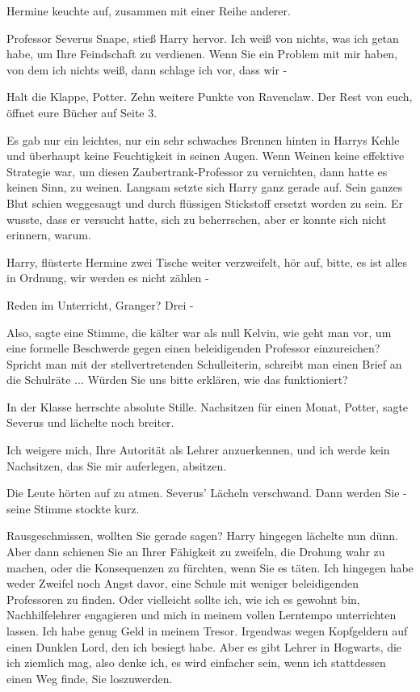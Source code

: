 Hermine keuchte auf, zusammen mit einer Reihe anderer.

\glqq{}Professor Severus Snape\grqq{}, stieß Harry hervor. \glqq{}Ich weiß von
nichts, was ich getan habe, um Ihre Feindschaft zu verdienen. Wenn Sie ein
Problem mit mir haben, von dem ich nichts weiß, dann schlage ich vor, dass wir
-\grqq{}

\glqq{}Halt die Klappe, Potter. Zehn weitere Punkte von Ravenclaw. Der Rest von
euch, öffnet eure Bücher auf Seite 3.\grqq{}

Es gab nur ein leichtes, nur ein sehr schwaches Brennen hinten in Harrys Kehle
und überhaupt keine Feuchtigkeit in seinen Augen. Wenn Weinen keine effektive
Strategie war, um diesen Zaubertrank-Professor zu vernichten, dann hatte es
keinen Sinn, zu weinen. Langsam setzte sich Harry ganz gerade auf. Sein ganzes
Blut schien weggesaugt und durch flüssigen Stickstoff ersetzt worden zu sein. Er
wusste, dass er versucht hatte, sich zu beherrschen, aber er konnte sich nicht
erinnern, warum.

\glqq{}Harry\grqq{}, flüsterte Hermine zwei Tische weiter verzweifelt, \glqq{}hör
auf, bitte, es ist alles in Ordnung, wir werden es nicht zählen -\grqq{}

\glqq{}Reden im Unterricht, Granger? Drei -\grqq{}

\glqq{}Also\grqq{}, sagte eine Stimme, die kälter war als null Kelvin, \glqq{}wie
geht man vor, um eine formelle Beschwerde gegen einen beleidigenden Professor
einzureichen? Spricht man mit der stellvertretenden Schulleiterin, schreibt man
einen Brief an die Schulräte ... Würden Sie uns bitte erklären, wie das
funktioniert?\grqq{}

In der Klasse herrschte absolute Stille. \glqq{}Nachsitzen für einen Monat,
Potter\grqq{}, sagte Severus und lächelte noch breiter.

\glqq{}Ich weigere mich, Ihre Autorität als Lehrer anzuerkennen, und ich werde
kein Nachsitzen, das Sie mir auferlegen, absitzen.\grqq{}

Die Leute hörten auf zu atmen. Severus' Lächeln verschwand. \glqq{}Dann werden
Sie -\grqq{} seine Stimme stockte kurz.

\glqq{}Rausgeschmissen, wollten Sie gerade sagen?\grqq{} Harry hingegen lächelte
nun dünn. \glqq{}Aber dann schienen Sie an Ihrer Fähigkeit zu zweifeln, die
Drohung wahr zu machen, oder die Konsequenzen zu fürchten, wenn Sie es täten.
Ich hingegen habe weder Zweifel noch Angst davor, eine Schule mit weniger
beleidigenden Professoren zu finden. Oder vielleicht sollte ich, wie ich es
gewohnt bin, Nachhilfelehrer engagieren und mich in meinem vollen Lerntempo
unterrichten lassen. Ich habe genug Geld in meinem Tresor. Irgendwas wegen
Kopfgeldern auf einen Dunklen Lord, den ich besiegt habe. Aber es gibt Lehrer in
Hogwarts, die ich ziemlich mag, also denke ich, es wird einfacher sein, wenn ich
stattdessen einen Weg finde, Sie loszuwerden.\grqq{}

